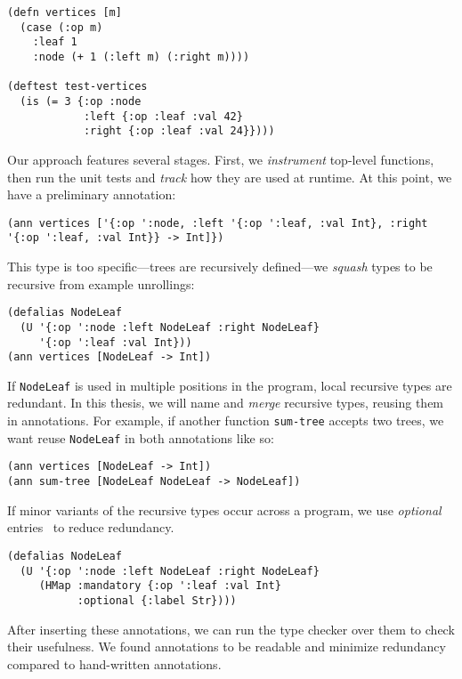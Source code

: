 \documentclass[9pt]{extarticle}
\begin{document}
\begin{Verbatim}
(defn vertices [m]
  (case (:op m)
    :leaf 1
    :node (+ 1 (:left m) (:right m))))

(deftest test-vertices
  (is (= 3 {:op :node
            :left {:op :leaf :val 42} 
            :right {:op :leaf :val 24}})))
\end{Verbatim}

Our approach features several stages.
First, we \textit{instrument} top-level functions,
then run the unit tests and \textit{track}
how they are used at runtime.
At this point, we have a preliminary
annotation:
%
\begin{Verbatim}
(ann vertices ['{:op ':node, :left '{:op ':leaf, :val Int}, :right '{:op ':leaf, :val Int}} -> Int]})
\end{Verbatim}
%
This type is too specific---trees are recursively
defined---we \textit{squash} types to be
recursive from example unrollings:

\begin{Verbatim}
(defalias NodeLeaf 
  (U '{:op ':node :left NodeLeaf :right NodeLeaf}
     '{:op ':leaf :val Int}))
(ann vertices [NodeLeaf -> Int])
\end{Verbatim}
%
%
If \texttt{NodeLeaf} is used in multiple positions
in the program, local recursive types are redundant.
In this thesis, we will name and \textit{merge} recursive
types, reusing them in annotations. For example,
if another function \texttt{sum-tree} accepts two
trees, we want reuse \texttt{NodeLeaf} in both annotations
like so:
%
\begin{Verbatim}
(ann vertices [NodeLeaf -> Int])
(ann sum-tree [NodeLeaf NodeLeaf -> NodeLeaf])
\end{Verbatim}

If minor variants of the recursive types occur
across a program,
we use \textit{optional} entries~\cite{bonnaire2016practical}
to reduce redundancy.
%
\begin{Verbatim}
(defalias NodeLeaf 
  (U '{:op ':node :left NodeLeaf :right NodeLeaf}
     (HMap :mandatory {:op ':leaf :val Int}
           :optional {:label Str})))
\end{Verbatim}
%
After inserting these annotations, we can run the
type checker over them to check their usefulness.
We found annotations to be readable and minimize
redundancy compared to hand-written annotations.
\end{document}
